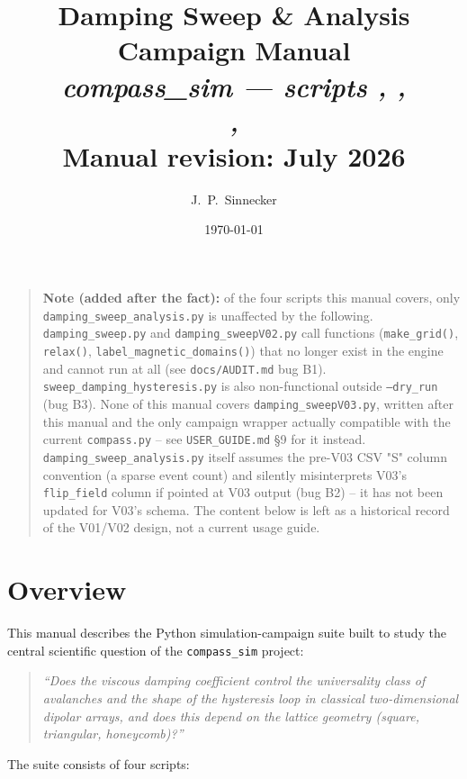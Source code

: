 \documentclass[11pt,a4paper]{article}
\title{\textbf{Damping Sweep \& Analysis Campaign Manual}\\[1ex]
\large\textit{compass\_sim --- scripts \file{damping\_sweep.py},
\file{damping\_sweepV02.py},\\
\file{sweep\_damping\_hysteresis.py},
\file{damping\_sweep\_analysis.py}}\\[1ex]
\normalsize Manual revision: July 2026}
\author{J.~P.~Sinnecker}
\date{\today}
\newcommand{\code}[1]{\texttt{#1}}
\newcommand{\file}[1]{\texttt{#1}}
\newcommand{\param}[1]{\texttt{--#1}}
\newcommand{\warn}[1]{\textcolor{warnorange}{\textbf{#1}}}
\begin{document}
\maketitle
\tableofcontents
\newpage

\begin{quote}
\warn{Note (added after the fact):} of the four scripts this manual covers,
only \file{damping\_sweep\_analysis.py} is unaffected by the following.
\file{damping\_sweep.py} and \file{damping\_sweepV02.py} call functions
(\code{make\_grid()}, \code{relax()}, \code{label\_magnetic\_domains()})
that no longer exist in the engine and cannot run at all (see
\file{docs/AUDIT.md} bug B1). \file{sweep\_damping\_hysteresis.py} is also
non-functional outside \param{dry\_run} (bug B3). None of this manual
covers \file{damping\_sweepV03.py}, written after this manual and the only
campaign wrapper actually compatible with the current \file{compass.py} --
see \file{USER\_GUIDE.md} \S9 for it instead. \file{damping\_sweep\_analysis.py}
itself assumes the pre-V03 CSV "S" column convention (a sparse event count)
and silently misinterprets V03's \code{flip\_field} column if pointed at
V03 output (bug B2) -- it has not been updated for V03's schema. The
content below is left as a historical record of the V01/V02 design, not a
current usage guide.
\end{quote}

\section{Overview}
\label{sec:overview}

This manual describes the Python simulation-campaign suite built to study
the central scientific question of the \texttt{compass\_sim} project:

\begin{quote}
\itshape ``Does the viscous damping coefficient control the universality
class of avalanches and the shape of the hysteresis loop in classical
two-dimensional dipolar arrays, and does this depend on the lattice
geometry (square, triangular, honeycomb)?''
\end{quote}

\noindent The suite consists of four scripts:
\end{document}
